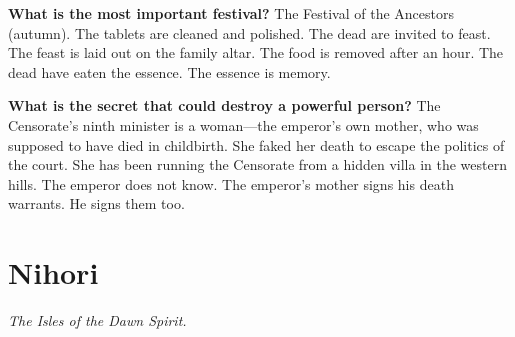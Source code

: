 \begin{almanac}
\textbf{What is the most important festival?} The Festival of the Ancestors (autumn). The tablets are cleaned and polished. The dead are invited to feast. The feast is laid out on the family altar. The food is removed after an hour. The dead have eaten the essence. The essence is memory.

\textbf{What is the secret that could destroy a powerful person?} The Censorate's ninth minister is a woman---the emperor's own mother, who was supposed to have died in childbirth. She faked her death to escape the politics of the court. She has been running the Censorate from a hidden villa in the western hills. The emperor does not know. The emperor's mother signs his death warrants. He signs them too.
\end{almanac}

\newpage

\newpage

\chapter{Nihori}
\emph{The Isles of the Dawn Spirit.}

